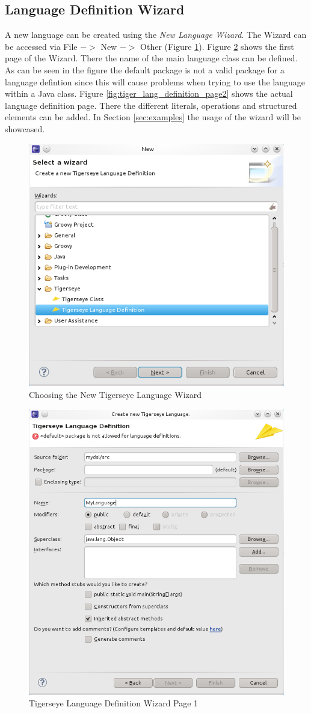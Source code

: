 	\subsection{\tiger Language Definition Wizard}
	  A new language can be created using the \textit{New Language Wizard}. The Wizard can be accessed via File $->$ New $->$ Other (Figure \ref{fig:new_tiger_lang}). Figure \ref{fig:tiger_lang_definition_page1} shows the first page of the Wizard. There the name of the main language class can be defined. As can be seen in the figure the default package is not a valid package for a language defintion since this will cause problems when trying to use the language within a Java class. Figure \ref{fig:tiger_lang_definition_page2} shows the actual language definition page. There the different literals, operations and structured elements can be added. In Section \ref{sec:examples} the usage of the wizard will be showcased.
	
	\begin{figure}
	  \centering
	  \includegraphics[width=.5\textwidth,keepaspectratio=true]{../pics/new_tigesreye_language.png}
	  \caption{Choosing the New Tigerseye Language Wizard}
	  \label{fig:new_tiger_lang}
	\end{figure}

	\begin{figure}
	  \centering
	  \includegraphics[width=.5\textwidth,keepaspectratio=true]{../pics/tigerseye_language_definition_page1.png}
	  \caption{Tigerseye Language Definition Wizard Page 1}
	  \label{fig:tiger_lang_definition_page1}
	\end{figure}
	
